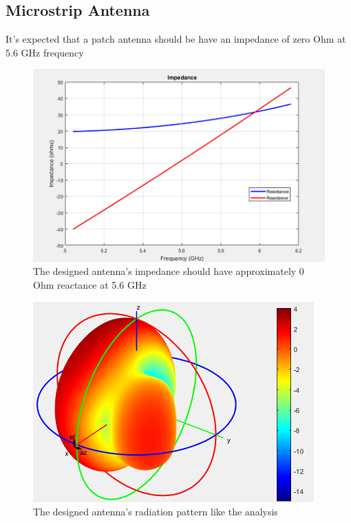 \documentclass[11pt,a4paper]{article}
\begin{document}
    \subsection{Microstrip Antenna}
      \indent It's expected that a patch antenna should be have an impedance of zero Ohm at 5.6 GHz frequency
      \begin{figure}[ht]
        \includegraphics{Impedance.png}
        \centering
        \caption{The designed antenna's impedance should have approximately 0 Ohm reactance at 5.6 GHz}
      \end{figure}

      \begin{figure}[ht]
        \includegraphics{Radiation_pattern}
        \centering
        \caption{The designed antenna's radiation pattern like the analysis}
      \end{figure}

  \newpage
\end{document}
